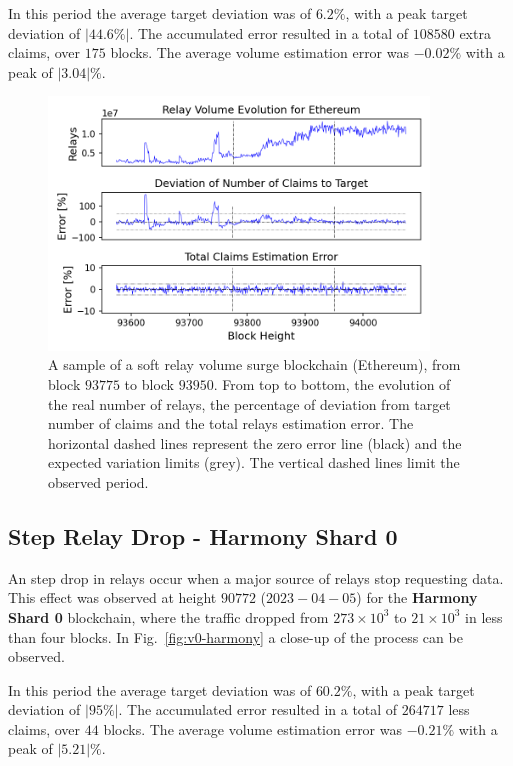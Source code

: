 \documentclass[runningheads]{llncs}
\begin{document}
In this period the average target deviation was of $6.2\%$, with a peak target deviation of $|44.6 \%|$. The accumulated error resulted in a total of $108580$ extra claims, over $175$ blocks. The average volume estimation error was $-0.02 \%$ with a peak of $|3.04| \%$.
\begin{figure}
\includegraphics[width=0.9\textwidth]{v0_eth.png}
\caption{A sample of a soft relay volume surge blockchain (Ethereum), from block $93775$  to block $93950$. From top to bottom, the evolution of the real number of relays, the percentage of deviation from target number of claims and the total relays estimation error. The horizontal dashed lines represent the zero error line (black) and the expected variation limits (grey). The vertical dashed lines limit the observed period.} \label{fig:v0-eth}
\end{figure}


\subsection{Step Relay Drop - Harmony Shard 0}
An step drop in relays occur when a major source of relays stop requesting data. This effect was observed at height $90772$ ($2023-04-05$) for the \textbf{Harmony Shard 0} blockchain, where the traffic dropped from $273\times 10^3$ to $21\times 10^3$ in less than four blocks. In Fig.~\ref{fig:v0-harmony} a close-up of the process can be observed.

In this period the average target deviation was of $60.2\%$, with a peak target deviation of $|95 \%|$. The accumulated error resulted in a total of $264717$ less claims, over $44$ blocks. The average volume estimation error was $-0.21 \%$ with a peak of $|5.21| \%$.
\end{document}
